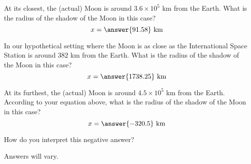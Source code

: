 \documentclass{ximera}
\begin{document}
\begin{problem}
  At its closest, the (actual) Moon is around $3.6\times 10^5$ km from
  the Earth.  What is the radius of the shadow of the Moon in this
  case?
  \[
  x = \answer{91.58} \text{ km}
  \]
\end{problem}

\begin{problem}
  In our hypothetical setting where the Moon is as close as the
  International Space Station is around $382$ km from the Earth.  What
  is the radius of the shadow of the Moon in this case?
  \[
  x = \answer{1738.25} \text{ km}
  \]
\end{problem}



\begin{problem}
  At its furthest, the (actual) Moon is around $4.5\times 10^5$ km
  from the Earth.  According to your equation above, what is the
  radius of the shadow of the Moon in this case?
  \[
  x = \answer{-320.5} \text{ km}
  \]
  \begin{problem}
    How do you interpret this negative answer?
    \begin{freeResponse}
      Answers will vary.
    \end{freeResponse}
  \end{problem}
\end{problem}
\end{document}
